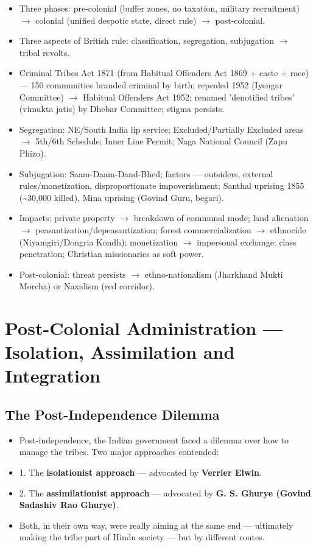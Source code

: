 \begin{QuickRevision}
\begin{itemize}
\item Three phases: pre-colonial (buffer zones, no taxation, military recruitment) $\rightarrow$ colonial (unified despotic state, direct rule) $\rightarrow$ post-colonial.
\item Three aspects of British rule: classification, segregation, subjugation $\rightarrow$ tribal revolts.
\item Criminal Tribes Act 1871 (from Habitual Offenders Act 1869 + caste + race) --- 150 communities branded criminal by birth; repealed 1952 (Iyengar Committee) $\rightarrow$ Habitual Offenders Act 1952; renamed 'denotified tribes' (vimukta jatis) by Dhebar Committee; stigma persists.
\item Segregation: NE/South India lip service; Excluded/Partially Excluded areas $\rightarrow$ 5th/6th Schedule; Inner Line Permit; Naga National Council (Zapu Phizo).
\item Subjugation: Saam-Daam-Dand-Bhed; factors --- outsiders, external rules/monetization, disproportionate impoverishment; Santhal uprising 1855 (\textasciitilde{}30,000 killed), Mina uprising (Govind Guru, begari).
\item Impacts: private property $\rightarrow$ breakdown of communal mode; land alienation $\rightarrow$ peasantization/depeasantization; forest commercialization $\rightarrow$ ethnocide (Niyamgiri/Dongria Kondh); monetization $\rightarrow$ impersonal exchange; class penetration; Christian missionaries as soft power.
\item Post-colonial: threat persists $\rightarrow$ ethno-nationalism (Jharkhand Mukti Morcha) or Naxalism (red corridor).
\end{itemize}
\end{QuickRevision}

\section{Post-Colonial Administration --- Isolation, Assimilation and Integration}

\subsection{The Post-Independence Dilemma}

\begin{KeyConcept}
\begin{itemize}
\item Post-independence, the Indian government faced a dilemma over how to manage the tribes. Two major approaches contended:
\item 1. The \textbf{isolationist approach} --- advocated by \textbf{Verrier Elwin}.
\item 2. The \textbf{assimilationist approach} --- advocated by \textbf{G. S. Ghurye (Govind Sadashiv Rao Ghurye)}.
\item Both, in their own way, were really aiming at the same end --- ultimately making the tribe part of Hindu society --- but by different routes.
\end{itemize}
\end{KeyConcept}

